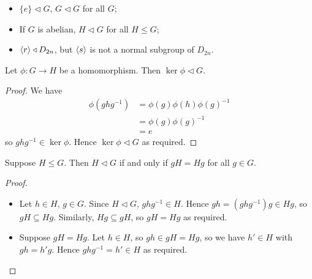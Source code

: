 \documentclass{../../template/note}
\begin{document}
    \begin{example}
        \begin{itemize}
            \item \(\{e\} \triangleleft G\), \(G \triangleleft G\) for all \(G\);
            \item If \(G\) is abelian, \(H \triangleleft G\) for all \(H \leq G\);
            \item \(\left \langle r \right \rangle \triangleleft D_{2n}\), but \(\left \langle s \right \rangle\) is not a normal subgroup of \(D_{2n}\).
        \end{itemize}
    \end{example}
    
    \begin{proposition}
        Let \(\phi: G \to H\) be a homomorphism. Then \(\ker \phi \triangleleft G\).
    \end{proposition}
    
    \begin{proof}
        We have
        \begin{align*}
            \phi(ghg^{-1}) &= \phi(g)\phi(h)\phi(g)^{-1} \\
            &= \phi(g)\phi(g)^{-1} \\
            &= e
        \end{align*}
        so \(ghg^{-1} \in \ker \phi\). Hence \(\ker \phi \triangleleft G\) as required.
    \end{proof}

    
    \begin{lemma}
        Suppose \(H \leq G\). Then \(H \triangleleft G\) if and only if \(gH = Hg\) for all \(g \in G\).
        \label{normal-subgroups-equal-cosets}
    \end{lemma}
    
    \begin{proof}
        \begin{itemize}
            \item[\(\implies\)] Let \(h \in H\), \(g \in G\). Since \(H \triangleleft G\), \(ghg^{-1} \in H\). Hence \(gh = (ghg^{-1})g \in Hg\), so \(gH \subseteq Hg\). Similarly, \(Hg \subseteq gH\), so \(gH = Hg\) as required.
            \item[\(\impliedby\)] Suppose \(gH = Hg\). Let \(h \in H\), so \(gh \in gH = Hg\), so we have \(h' \in H\) with \(gh = h'g\). Hence \(ghg^{-1} = h' \in H\) as required. 
        \end{itemize}
    \end{proof}
    
\end{document}
